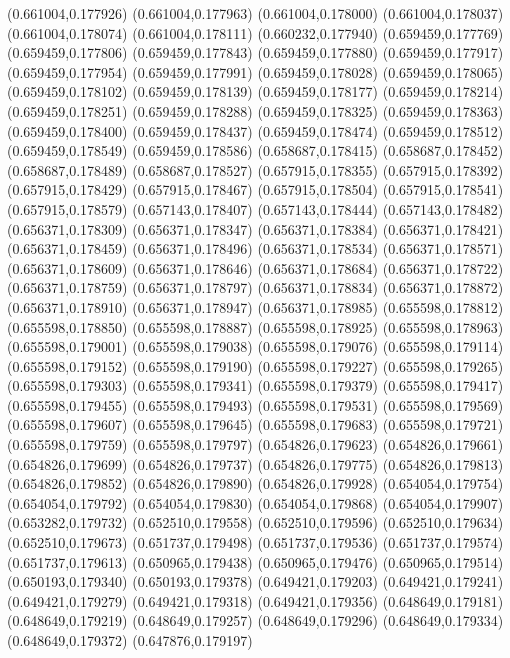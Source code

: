 (0.661004,0.177926)
(0.661004,0.177963)
(0.661004,0.178000)
(0.661004,0.178037)
(0.661004,0.178074)
(0.661004,0.178111)
(0.660232,0.177940)
(0.659459,0.177769)
(0.659459,0.177806)
(0.659459,0.177843)
(0.659459,0.177880)
(0.659459,0.177917)
(0.659459,0.177954)
(0.659459,0.177991)
(0.659459,0.178028)
(0.659459,0.178065)
(0.659459,0.178102)
(0.659459,0.178139)
(0.659459,0.178177)
(0.659459,0.178214)
(0.659459,0.178251)
(0.659459,0.178288)
(0.659459,0.178325)
(0.659459,0.178363)
(0.659459,0.178400)
(0.659459,0.178437)
(0.659459,0.178474)
(0.659459,0.178512)
(0.659459,0.178549)
(0.659459,0.178586)
(0.658687,0.178415)
(0.658687,0.178452)
(0.658687,0.178489)
(0.658687,0.178527)
(0.657915,0.178355)
(0.657915,0.178392)
(0.657915,0.178429)
(0.657915,0.178467)
(0.657915,0.178504)
(0.657915,0.178541)
(0.657915,0.178579)
(0.657143,0.178407)
(0.657143,0.178444)
(0.657143,0.178482)
(0.656371,0.178309)
(0.656371,0.178347)
(0.656371,0.178384)
(0.656371,0.178421)
(0.656371,0.178459)
(0.656371,0.178496)
(0.656371,0.178534)
(0.656371,0.178571)
(0.656371,0.178609)
(0.656371,0.178646)
(0.656371,0.178684)
(0.656371,0.178722)
(0.656371,0.178759)
(0.656371,0.178797)
(0.656371,0.178834)
(0.656371,0.178872)
(0.656371,0.178910)
(0.656371,0.178947)
(0.656371,0.178985)
(0.655598,0.178812)
(0.655598,0.178850)
(0.655598,0.178887)
(0.655598,0.178925)
(0.655598,0.178963)
(0.655598,0.179001)
(0.655598,0.179038)
(0.655598,0.179076)
(0.655598,0.179114)
(0.655598,0.179152)
(0.655598,0.179190)
(0.655598,0.179227)
(0.655598,0.179265)
(0.655598,0.179303)
(0.655598,0.179341)
(0.655598,0.179379)
(0.655598,0.179417)
(0.655598,0.179455)
(0.655598,0.179493)
(0.655598,0.179531)
(0.655598,0.179569)
(0.655598,0.179607)
(0.655598,0.179645)
(0.655598,0.179683)
(0.655598,0.179721)
(0.655598,0.179759)
(0.655598,0.179797)
(0.654826,0.179623)
(0.654826,0.179661)
(0.654826,0.179699)
(0.654826,0.179737)
(0.654826,0.179775)
(0.654826,0.179813)
(0.654826,0.179852)
(0.654826,0.179890)
(0.654826,0.179928)
(0.654054,0.179754)
(0.654054,0.179792)
(0.654054,0.179830)
(0.654054,0.179868)
(0.654054,0.179907)
(0.653282,0.179732)
(0.652510,0.179558)
(0.652510,0.179596)
(0.652510,0.179634)
(0.652510,0.179673)
(0.651737,0.179498)
(0.651737,0.179536)
(0.651737,0.179574)
(0.651737,0.179613)
(0.650965,0.179438)
(0.650965,0.179476)
(0.650965,0.179514)
(0.650193,0.179340)
(0.650193,0.179378)
(0.649421,0.179203)
(0.649421,0.179241)
(0.649421,0.179279)
(0.649421,0.179318)
(0.649421,0.179356)
(0.648649,0.179181)
(0.648649,0.179219)
(0.648649,0.179257)
(0.648649,0.179296)
(0.648649,0.179334)
(0.648649,0.179372)
(0.647876,0.179197)
